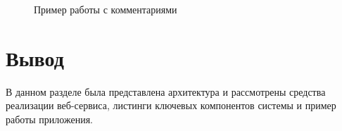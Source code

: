 \begin{figure}[!h]
	\caption{Пример работы с комментариями}
	\label{fig:app3}
\end{figure}

\newpage

\section*{Вывод}

В данном разделе была представлена архитектура и рассмотрены средства реализации веб-сервиса, листинги ключевых компонентов системы и пример работы приложения.
